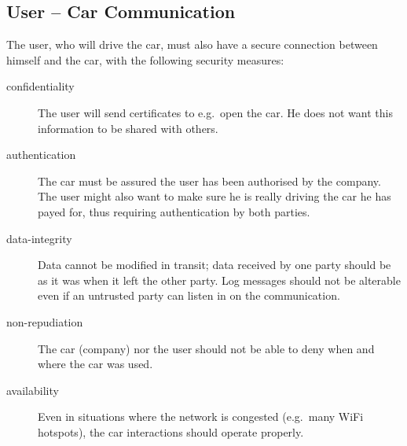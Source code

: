 \subsection{User -- Car Communication}

The user, who will drive the car, must also have a secure connection between himself and the car, with the following security measures:

\begin{description}
	\item[confidentiality] The user will send certificates to e.g.\ open the car. He does not want this information to be shared with others.
	\item[authentication] The car must be assured the user has been authorised by the company. The user might also want to make sure he is really driving the car he has payed for, thus requiring authentication by both parties.
	\item[data-integrity] Data cannot be modified in transit; data received by one party should be as it was when it left the other party. Log messages should not be alterable even if an untrusted party can listen in on the communication.
	\item[non-repudiation] The car (company) nor the user should not be able to deny when and where the car was used.
	\item[availability] Even in situations where the network is congested (e.g.\ many WiFi hotspots), the car interactions should operate properly.
\end{description}
